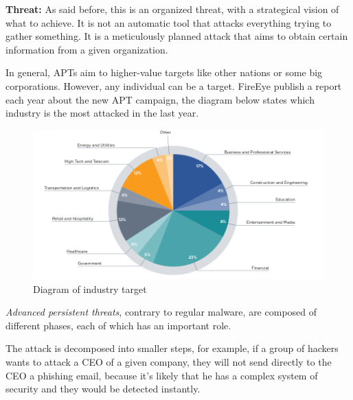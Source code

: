 \textbf{Threat:} As said before, this is an organized threat, with a strategical vision of what to achieve. It is not an automatic tool that attacks everything trying to gather something. It is a meticulously planned attack that aims to obtain certain information from a given organization. 

In general, APTs aim to higher-value targets like other nations or some big corporations. However, any individual can be a target. FireEye publish a report each year about the new APT campaign, the diagram below states which industry is the most attacked in the last year.\\

\begin{figure}[!h]
	\centering
	\includegraphics[width=1.0\columnwidth]{graph}
	\caption{Diagram of industry target}
\end{figure}





\textit{Advanced persistent threats}, contrary to regular malware, are composed of different phases, each of which has an important role. 

The attack is decomposed into smaller steps, for example, if a group of hackers wants to attack a CEO of a given company, they will not send directly to the CEO a phishing email, because it's likely that he has a complex system of security and they would be detected instantly. 

